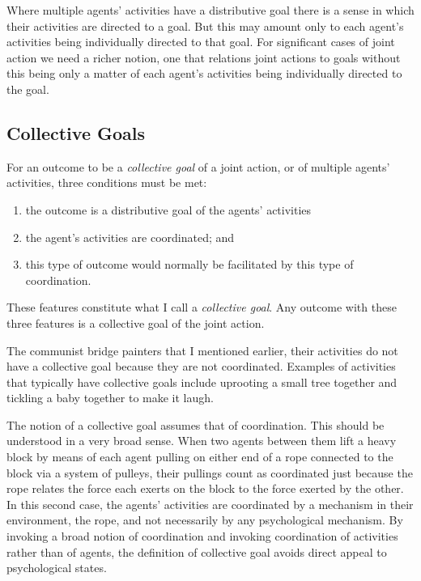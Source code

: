 \documentclass[12pt,a4paper]{extarticle}
\begin{document}
Where multiple agents' activities have a distributive goal there is a sense in which their activities are directed to a goal.  
But this may amount only to each agent's activities being individually directed to that goal.  
For significant cases of joint action we need a richer notion, one that relations joint actions to goals without this being only a matter of each agent's activities being individually directed to the goal.



\subsection{Collective Goals}
\label{section_collective}

For an outcome to be a \emph{collective goal} of a joint action, or of multiple agents' activities, three conditions must be met:
%
\begin{enumerate}
\item the outcome is a distributive goal of the agents' activities
\item the agent's activities are coordinated; and
\item this type of outcome would normally be facilitated by this type of coordination.
\end{enumerate}
%
These features constitute what I call a \emph{collective goal}.  Any outcome with these three features is a collective goal of the joint action.

The communist bridge painters that I mentioned earlier, their activities do not have a collective goal because they are not coordinated.
Examples of activities that typically have collective goals include uprooting a small tree together and tickling a baby together to make it laugh.

The notion of a collective goal assumes that of coordination.  This should be understood in a very broad sense.  
When two agents between them lift a heavy block by means of each agent pulling on either end of a rope connected to the block via a system of pulleys, their pullings count as coordinated just because the rope relates the force each exerts on the block to the force exerted by the other.  
In this second case, the agents' activities are coordinated by a mechanism in their environment, the rope, and not necessarily by any psychological mechanism.  
By invoking a broad notion of coordination 
and invoking coordination of activities rather than of agents,
the definition of collective goal avoids direct appeal to psychological states.
\end{document}
